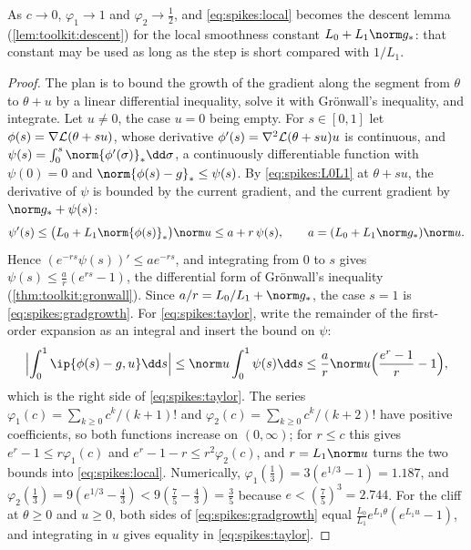 \begin{refsection}
As $c\to0$, $\varphi_1\to1$ and $\varphi_2\to\frac12$, and \eqref{eq:spikes:local} becomes the descent lemma (\cref{lem:toolkit:descent}) for the local smoothness constant $L_0+L_1\norm g_*$: that constant may be used as long as the step is short compared with $1/L_1$.

\begin{proof}
The plan is to bound the growth of the gradient along the segment from $\theta$ to $\theta+u$ by a linear differential inequality, solve it with Grönwall's inequality, and integrate. Let $u\ne0$, the case $u=0$ being empty. For $s\in[0,1]$ let $\phi(s)=\nabla\mathcal{L}(\theta+su)$, whose derivative $\phi'(s)=\nabla^2\mathcal{L}(\theta+su)u$ is continuous, and $\psi(s)=\int_0^s\norm{\phi'(\sigma)}_*\dd\sigma$, a continuously differentiable function with $\psi(0)=0$ and $\norm{\phi(s)-g}_*\le\psi(s)$. By \eqref{eq:spikes:L0L1} at $\theta+su$, the derivative of $\psi$ is bounded by the current gradient, and the current gradient by $\norm g_*+\psi(s)$:
\[
  \psi'(s)\le\bigl(L_0+L_1\norm{\phi(s)}_*\bigr)\norm u\le a+r\,\psi(s),\qquad a=(L_0+L_1\norm g_*)\norm u .
\]
Hence $(e^{-rs}\psi(s))'\le ae^{-rs}$, and integrating from $0$ to $s$ gives $\psi(s)\le\frac ar(e^{rs}-1)$, the differential form of Grönwall's inequality (\cref{thm:toolkit:gronwall}). Since $a/r=L_0/L_1+\norm g_*$, the case $s=1$ is \eqref{eq:spikes:gradgrowth}. For \eqref{eq:spikes:taylor}, write the remainder of the first-order expansion as an integral and insert the bound on $\psi$:
\[
  \Bigl\lvert\int_0^1\ip{\phi(s)-g,u}\dd s\Bigr\rvert\le\norm u\int_0^1\psi(s)\dd s\le\frac ar\norm u\Bigl(\frac{e^r-1}r-1\Bigr),
\]
which is the right side of \eqref{eq:spikes:taylor}. The series $\varphi_1(c)=\sum_{k\ge0}c^k/(k+1)!$ and $\varphi_2(c)=\sum_{k\ge0}c^k/(k+2)!$ have positive coefficients, so both functions increase on $(0,\infty)$; for $r\le c$ this gives $e^r-1\le r\varphi_1(c)$ and $e^r-1-r\le r^2\varphi_2(c)$, and $r=L_1\norm u$ turns the two bounds into \eqref{eq:spikes:local}. Numerically, $\varphi_1(\frac13)=3(e^{1/3}-1)=1.187$, and $\varphi_2(\frac13)=9(e^{1/3}-\frac43)<9(\frac75-\frac43)=\frac35$ because $e<(\frac75)^3=2.744$. For the cliff at $\theta\ge0$ and $u\ge0$, both sides of \eqref{eq:spikes:gradgrowth} equal $\frac{L_0}{L_1}e^{L_1\theta}(e^{L_1u}-1)$, and integrating in $u$ gives equality in \eqref{eq:spikes:taylor}.
\end{proof}


\end{refsection}
